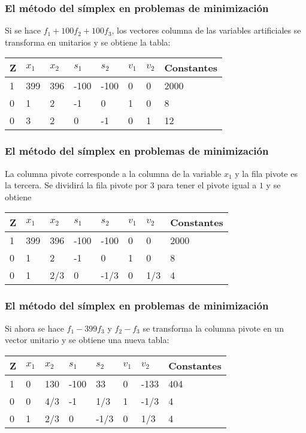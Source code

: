\documentclass{beamer}
\begin{document}
\begin{frame}
\frametitle{El m\'etodo del s\'implex en problemas de minimizaci\'on}
Si se hace $f_1+100f_2+100f_3$, los vectores columna de las variables artificiales se transforma en unitarios y se obtiene la tabla:
\begin{tabular}{ |p{1cm}||p{0.8cm}|p{0.8cm}|p{0.8cm}|p{0.8cm}|p{0.8cm}|p{0.8cm}|p{1.6cm}|  }
 \hline
 Z & $x_1$ & $x_2$ & $s_1$& $s_2$ & $v_1$  & $v_2$& Constantes \\
 \hline
1 &399 & 396 & -100 & -100& 0& 0 & 2000 \\
0 & 1 &  2 & -1 & 0 & 1 & 0 & 8 \\
0 & 3 & 2 & 0 & -1 & 0 & 1  & 12 \\
 \hline
\end{tabular}
\end{frame}


\begin{frame}
\frametitle{El m\'etodo del s\'implex en problemas de minimizaci\'on}
La columna pivote corresponde a la columna de la variable $x_1$ y la fila pivote es la tercera. Se dividir\'a la fila pivote por $3$ para tener el pivote igual    a $1$ y se obtiene
\begin{tabular}{ |p{1cm}||p{0.8cm}|p{0.8cm}|p{0.8cm}|p{0.8cm}|p{0.8cm}|p{0.8cm}|p{1.6cm}|  }
 \hline
 Z & $x_1$ & $x_2$ & $s_1$& $s_2$ & $v_1$  & $v_2$& Constantes \\
 \hline
1 &399 & 396 & -100 & -100& 0& 0 & 2000 \\
0 & 1 &  2 & -1 & 0 & 1 & 0 & 8 \\
0 & 1 & 2/3 & 0 & -1/3 & 0 & 1/3  & 4 \\
 \hline
\end{tabular}
\end{frame}


\begin{frame}
\frametitle{El m\'etodo del s\'implex en problemas de minimizaci\'on}
Si ahora se hace $f_1-399f_3$ y $f_2-f_3$ se transforma la columna pivote en un vector unitario y se obtiene una nueva tabla:
\begin{tabular}{ |p{1cm}||p{0.8cm}|p{0.8cm}|p{0.8cm}|p{0.8cm}|p{0.8cm}|p{0.8cm}|p{1.6cm}|  }
 \hline
 Z & $x_1$ & $x_2$ & $s_1$& $s_2$ & $v_1$  & $v_2$& Constantes \\
 \hline
1 &0 & 130 & -100 & 33& 0& -133 & 404 \\
0 & 0 &  4/3 & -1 & 1/3 & 1 & -1/3 & 4 \\
0 & 1 & 2/3 & 0 & -1/3 & 0 & 1/3  & 4 \\
 \hline
\end{tabular}
\end{frame}
\end{document}
